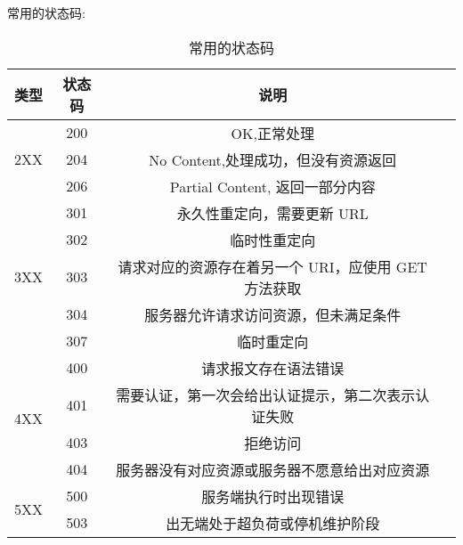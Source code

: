 常用的状态码:

\begin{table}[H]
    \centering
    \caption{常用的状态码}
    \label{table:常用的状态码}
    \setlength{\tabcolsep}{4mm}
    \begin{tabular}{c|c|cc}
        \toprule
        \textbf{类型} & \textbf{状态码} & \textbf{说明} \\
        \midrule
        \multirow{3}{*}{2XX} & 200 & OK,正常处理 \\
         & 204 & No Content,处理成功，但没有资源返回 \\
         & 206 & Partial Content, 返回一部分内容 \\
        \midrule
        \multirow{5}{*}{3XX} & 301 & 永久性重定向，需要更新 URL \\
         & 302 & 临时性重定向 \\
         & 303 & 请求对应的资源存在着另一个 URI，应使用 GET 方法获取 \\
         & 304 & 服务器允许请求访问资源，但未满足条件 \\
         & 307 & 临时重定向 \\
        \midrule
        \multirow{4}{*}{4XX} & 400 & 请求报文存在语法错误 \\
         & 401 & 需要认证，第一次会给出认证提示，第二次表示认证失败 \\
         & 403 & 拒绝访问 \\
         & 404 & 服务器没有对应资源或服务器不愿意给出对应资源 \\
        \multirow{2}{*}{5XX} & 500 & 服务端执行时出现错误 \\
         & 503 & 出无端处于超负荷或停机维护阶段 \\
        \bottomrule
    \end{tabular}
\end{table}

\newpage
